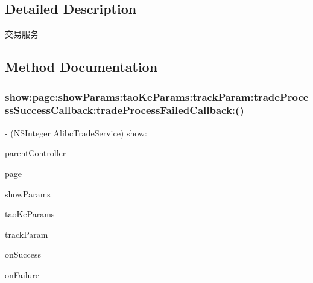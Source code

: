 \subsection{Detailed Description}
交易服务 

\subsection{Method Documentation}
\mbox{\label{protocol_alibc_trade_service_01-p_ad502ae9120c077614429b937784c2a7f}} 
\subsubsection{\texorpdfstring{show\+:page\+:show\+Params\+:tao\+Ke\+Params\+:track\+Param\+:trade\+Process\+Success\+Callback\+:trade\+Process\+Failed\+Callback\+:()}{show:page:showParams:taoKeParams:trackParam:tradeProcessSuccessCallback:tradeProcessFailedCallback:()}}
{\footnotesize\ttfamily -\/ (N\+S\+Integer Alibc\+Trade\+Service) show\+: \begin{DoxyParamCaption}\item[{(U\+I\+View\+Controller $\ast$\+\_\+\+\_\+nonnull)}]{parent\+Controller }\item[{page:(id$<$ Alibc\+Trade\+Page $>$ \+\_\+\+\_\+nonnull)}]{page }\item[{showParams:(nullable \mbox{\hyperlink{interface_alibc_trade_show_params}{Alibc\+Trade\+Show\+Params}} $\ast$)}]{show\+Params }\item[{taoKeParams:(nullable \mbox{\hyperlink{interface_alibc_trade_taoke_params}{Alibc\+Trade\+Taoke\+Params}} $\ast$)}]{tao\+Ke\+Params }\item[{trackParam:(nullable N\+S\+Dictionary $\ast$)}]{track\+Param }\item[{tradeProcessSuccessCallback:(nullable void($^\wedge$)(\mbox{\hyperlink{interface_alibc_trade_result}{Alibc\+Trade\+Result}} $\ast$\+\_\+\+\_\+nullable result))}]{on\+Success }\item[{tradeProcessFailedCallback:(nullable void($^\wedge$)(N\+S\+Error $\ast$\+\_\+\+\_\+nullable error))}]{on\+Failure }\end{DoxyParamCaption}}

